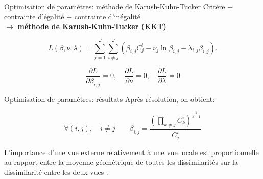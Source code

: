 \documentclass[hyperref={pdfpagelabels=false}]{beamer}
\begin{document}
    \begin{frame}{Optimisation de paramètres: méthode de Karush-Kuhn-Tucker}
        Critère + contrainte d'égalité + contrainte d'inégalité\\
        $\rightarrow$ \textbf{méthode de Karush-Kuhn-Tucker (KKT)} 

        \begin{equation*}
        L(\beta,\nu,\lambda)=\sum_{j=1}^J  \sum_{i \neq j}^J ( \beta_{i,j}  C_j^i
        - \nu_j  \ln  \beta_{i,j}  - \lambda_{i,j}   \beta_{i,j} ).
        \end{equation*}

        \begin{equation*}
            \frac{\partial L}{\partial \beta_{i,j}} = 0,
            \quad
            \frac{\partial L}{\partial \nu} = 0,
            \quad
            \frac{\partial L}{\partial \lambda} = 0
        \end{equation*}
    \end{frame}
    
    \begin{frame}{Optimisation de paramètres: résultats}
        Après résolution, on obtient:

        \vspace{0.6cm}

        \begin{equation*}
            \forall (i,j), \quad i\neq j \qquad \beta_{i,j} =  
            \frac{(\prod_{k\neq j} C_k^i)^{\frac 
            1 {J-1}}}{C_j^i}
        \end{equation*} 

        \vspace{1cm}
        L'importance d'une vue externe relativement à une vue locale est
        proportionnelle au rapport entre la moyenne géométrique de toutes les
        dissimilarités sur la dissimilarité entre les deux vues
        .\\
    \end{frame}
\end{document}
